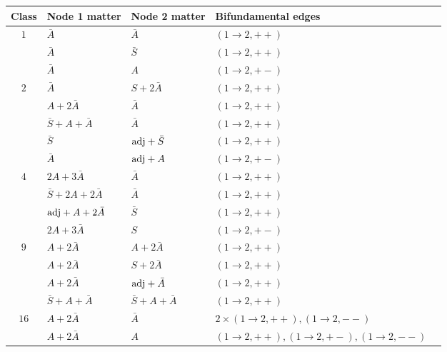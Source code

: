 \begin{table}[h]
  \centering
  \small
  \setlength{\tabcolsep}{4pt}
  \begin{tabular}{cllll}
    \toprule
    Class & Node 1 matter & Node 2 matter & Bifundamental edges \\
    \midrule
    $1$  & $\bar A$                    & $\bar A$                  & $(1\!\to\!2,++)$ \\
         & $\bar A$                    & $\bar S$                  & $(1\!\to\!2,++)$ \\
         & $\bar A$                    & $A$                       & $(1\!\to\!2,+-)$ \\
    \midrule
    $2$  & $\bar A$                    & $S+2\bar A$               & $(1\!\to\!2,++)$ \\
         & $A+2\bar A$                 & $\bar A$                  & $(1\!\to\!2,++)$ \\
         & $\bar S + A+\bar A$         & $\bar A$                  & $(1\!\to\!2,++)$ \\
         & $\bar S$                    & $\mathrm{adj}+\bar S$             & $(1\!\to\!2,++)$ \\
         & $\bar A$                    & $\mathrm{adj}+A$                  & $(1\!\to\!2,+-)$ \\
    \midrule
    $4$  & $2A+3\bar A$                & $\bar A$                  & $(1\!\to\!2,++)$ \\
         & $\bar S+2A+2\bar A$         & $\bar A$                  & $(1\!\to\!2,++)$ \\
         & $\mathrm{adj}+A+2\bar A$            & $\bar S$                  & $(1\!\to\!2,++)$ \\
         & $2A+3\bar A$                & $S$                       & $(1\!\to\!2,+-)$ \\
    \midrule
    $9$  & $A+2\bar A$                 & $A+2\bar A$               & $(1\!\to\!2,++)$ \\
         & $A+2\bar A$                 & $S+2\bar A$               & $(1\!\to\!2,++)$ \\
         & $A+2\bar A$                 & $\mathrm{adj}+\bar A$             & $(1\!\to\!2,++)$ \\
         & $\bar S+A+\bar A$           & $\bar S+A+\bar A$         & $(1\!\to\!2,++)$ \\
    \midrule
    $16$ & $A+2\bar A$                 & $\bar A$                  & $2\!\times\!(1\!\to\!2,++),(1\!\to\!2,--)$ \\
         & $A+2\bar A$                 & $A$                       & $(1\!\to\!2,++),(1\!\to\!2,+-),(1\!\to\!2,--)$ \\

\end{tabular}
\end{table}
